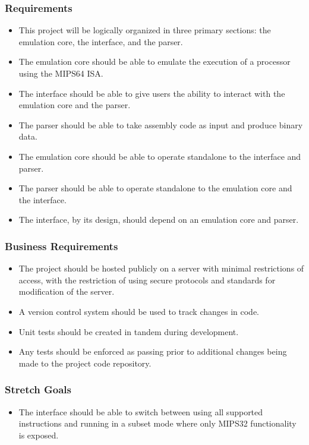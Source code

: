 \documentclass[
    paper=letter,
    parskip=half,
    fontsize=12pt,
    titlepage=firstiscover,
    toc=bibliography,
    numbers=endperiod
]{scrartcl}
\begin{document}
\subsubsection{Requirements}
\begin{itemize}
    \item This project will be logically organized in three primary sections: the emulation core, the interface, and the parser.
    \item The emulation core should be able to emulate the execution of a processor using the MIPS64 ISA.
    \item The interface should be able to give users the ability to interact with the emulation core and the parser.
    \item The parser should be able to take assembly code as input and produce binary data.
    \item The emulation core should be able to operate standalone to the interface and parser.
    \item The parser should be able to operate standalone to the emulation core and the interface.
    \item The interface, by its design, should depend on an emulation core and parser.
\end{itemize}

\subsubsection{Business Requirements}
\begin{itemize}
    \item The project should be hosted publicly on a server with minimal restrictions of access, with the restriction of using secure protocols and standards for modification of the server.
    \item A version control system should be used to track changes in code.
    \item Unit tests should be created in tandem during development.
    \item Any tests should be enforced as passing prior to additional changes being made to the project code repository.
\end{itemize}

\subsubsection{Stretch Goals}
\begin{itemize}
    \item The interface should be able to switch between using all supported instructions and running in a subset mode where only MIPS32 functionality is exposed.
\end{itemize}
\end{document}
